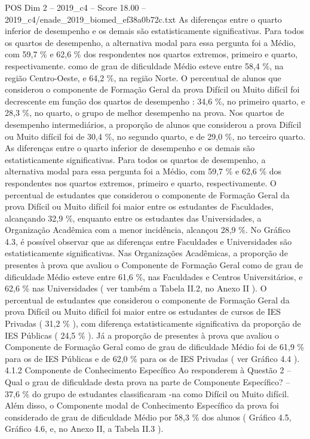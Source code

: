 \begin{textsample}{POS Dim 2 – 2019\_c4 – Score 18.00 – 2019\_c4/enade\_2019\_biomed\_ef38a0b72c.txt}
As diferenças entre o quarto inferior de desempenho e os demais são estatisticamente significativas.
Para todos os quartos de desempenho, a alternativa modal para essa pergunta foi a Médio, com 59,7 \% e 62,6 \% dos respondentes nos quartos extremos, primeiro e quarto, respectivamente. como de grau de dificuldade Médio esteve entre 58,4 \%, na região Centro-Oeste, e 64,2 \%, na região Norte.
O percentual de alunos que considerou o componente de Formação Geral da prova Difícil ou Muito difícil foi decrescente em função dos quartos de desempenho : 34,6 \%, no primeiro quarto, e 28,3 \%, no quarto, o grupo de melhor desempenho na prova.
Nos quartos de desempenho intermediários, a proporção de alunos que considerou a prova Difícil ou Muito difícil foi de 30,4 \%, no segundo quarto, e de 29,0 \%, no terceiro quarto.
As diferenças entre o quarto inferior de desempenho e os demais são estatisticamente significativas.
Para todos os quartos de desempenho, a alternativa modal para essa pergunta foi a Médio, com 59,7 \% e 62,6 \% dos respondentes nos quartos extremos, primeiro e quarto, respectivamente.
O percentual de estudantes que considerou o componente de Formação Geral da prova Difícil ou Muito difícil foi maior entre os estudantes de Faculdades, alcançando 32,9 \%, enquanto entre os estudantes das Universidades, a Organização Acadêmica com a menor incidência, alcançou 28,9 \%.
No Gráfico 4.3, é possível observar que as diferenças entre Faculdades e Universidades são estatisticamente significativas.
Nas Organizações Acadêmicas, a proporção de presentes à prova que avaliou o Componente de Formação Geral como de grau de dificuldade Médio esteve entre 61,6 \%, nas Faculdades e Centros Universitários, e 62,6 \% nas Universidades ( ver também a Tabela II.2, no Anexo II ).
O percentual de estudantes que considerou o componente de Formação Geral da prova Difícil ou Muito difícil foi maior entre os estudantes de cursos de IES Privadas ( 31,2 \% ), com diferença estatisticamente significativa da proporção de IES Públicas ( 24,5 \% ).
Já a proporção de presentes à prova que avaliou o Componente de Formação Geral como de grau de dificuldade Médio foi de 61,9 \% para os de IES Públicas e de 62,0 \% para os de IES Privadas ( ver Gráfico 4.4 ). 4.1.2 Componente de Conhecimento Específico Ao responderem à Questão 2 – Qual o grau de dificuldade desta prova na parte de Componente Específico? – 37,6 \% do grupo de estudantes classificaram -na como Difícil ou Muito difícil.
Além disso, o Componente modal de Conhecimento Específico da prova foi considerado de grau de dificuldade Médio por 58,3 \% dos alunos ( Gráfico 4.5, Gráfico 4.6, e, no Anexo II, a Tabela II.3 ).

\end{textsample}
